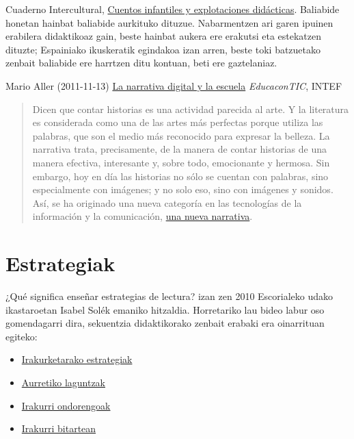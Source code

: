 \documentclass[
]{book}
\providecommand{\tightlist}{%
  \setlength{\itemsep}{0pt}\setlength{\parskip}{0pt}}
\begin{document}
Cuaderno Intercultural, \href{http://www.cuadernointercultural.com/materiales/lectura/cuentos-fabulas-y-leyendas/\#cuentosdidact}{Cuentos infantiles y explotaciones didácticas}.
Baliabide honetan hainbat baliabide aurkituko dituzue. Nabarmentzen ari garen ipuinen erabilera didaktikoaz gain, beste hainbat aukera ere erakutsi eta estekatzen dituzte; Espainiako ikuskeratik egindakoa izan arren, beste toki batzuetako zenbait baliabide ere harrtzen ditu kontuan, beti ere gaztelaniaz.

Mario Aller (2011-11-13) \href{http://www.educacontic.es/blog/la-narrativa-digital-y-la-escuela}{La narrativa digital y la escuela} \emph{EducaconTIC}, INTEF

\begin{quote}
Dicen que contar historias es una actividad parecida al arte. Y la
literatura es considerada como una de las artes más perfectas porque utiliza las palabras,
que son el medio más reconocido para expresar la belleza. La narrativa
trata, precisamente, de la manera de contar historias de una manera
efectiva, interesante y, sobre todo, emocionante y hermosa. Sin embargo,
hoy en día las historias no sólo se cuentan con palabras, sino
especialmente con imágenes; y no solo eso, sino con imágenes y sonidos.
Así, se ha originado una nueva categoría en las tecnologías de la
información y la comunicación, \href{http://www.storycenter.org/}{una nueva narrativa}.
\end{quote}

\hypertarget{estrategiak}{%
\section{Estrategiak}\label{estrategiak}}

¿Qué significa enseñar estrategias de lectura? izan zen 2010 Escorialeko udako ikastaroetan Isabel Solék emaniko hitzaldia. Horretariko lau bideo labur oso gomendagarri dira, sekuentzia didaktikorako zenbait erabaki era oinarrituan egiteko:

\begin{itemize}
\tightlist
\item
  \href{http://leer.es/web/leer/-/estrategias-de-lectura-1-introduccion}{Irakurketarako estrategiak}
\item
  \href{http://leer.es/web/leer/-/estrategias-de-lectura-10-ayudas-previas}{Aurretiko laguntzak}
\item
  \href{http://leer.es/web/leer/-/estrategias-de-lectura-12-despues-de-leer}{Irakurri ondorengoak}
\item
  \href{http://leer.es/web/leer/-/estrategias-de-lectura-11-durante-la-lectura}{Irakurri bitartean}
\end{itemize}
\end{document}
